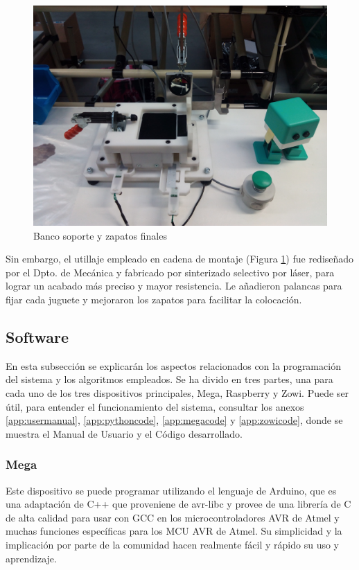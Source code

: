 \begin{figure}
\centering
\includegraphics[width=120mm]{Figures/bancoFabrica}
\caption{Banco soporte y zapatos finales}
\label{fig:bancoFabrica}
\end{figure}

Sin embargo, el utillaje empleado en cadena de montaje (Figura \ref{fig:bancoFabrica}) fue rediseñado por el Dpto. de Mecánica y fabricado por sinterizado selectivo por láser, para lograr un acabado más preciso y mayor resistencia. Le añadieron palancas para fijar cada juguete y mejoraron los zapatos para facilitar la colocación.


\subsection{Software}
\label{subsec:Software}
En esta subsección se explicarán los aspectos relacionados con la programación del sistema y los algoritmos empleados. Se ha divido en tres partes, una para cada uno de los tres dispositivos principales, Mega, Raspberry y Zowi. Puede ser útil, para entender el funcionamiento del sistema, consultar los anexos \ref{app:usermanual}, \ref{app:pythoncode}, \ref{app:megacode} y \ref{app:zowicode}, donde se muestra el Manual de Usuario y el Código desarrollado.

\subsubsection{Mega}
Este dispositivo se puede programar utilizando el lenguaje de Arduino,  que es una adaptación de C++ que proveniene de avr-libc y provee de una librería de C de alta calidad para usar con GCC en los microcontroladores AVR de Atmel y muchas funciones específicas para los MCU AVR de Atmel. Su simplicidad y la implicación por parte de la comunidad hacen realmente fácil y rápido su uso y aprendizaje.

